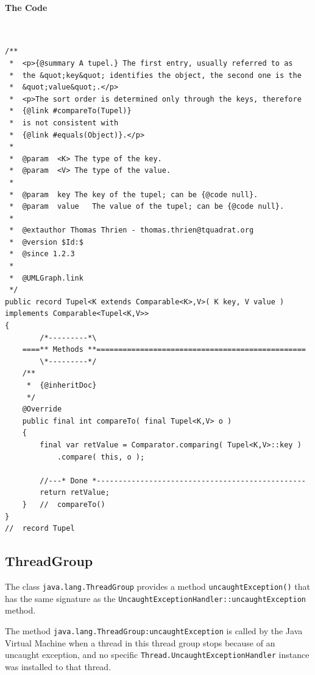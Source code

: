 \paragraph{The Code} \
\begin{lstlisting}[caption={A tupel class}]
/**
 *  <p>{@summary A tupel.} The first entry, usually referred to as 
 *  the &quot;key&quot; identifies the object, the second one is the
 *  &quot;value&quot;.</p>
 *  <p>The sort order is determined only through the keys, therefore
 *  {@link #compareTo(Tupel)}
 *  is not consistent with
 *  {@link #equals(Object)}.</p>
 *
 *  @param  <K> The type of the key.
 *  @param  <V> The type of the value.
 *
 *  @param  key The key of the tupel; can be {@code null}.
 *  @param  value   The value of the tupel; can be {@code null}.
 *
 *  @extauthor Thomas Thrien - thomas.thrien@tquadrat.org
 *  @version $Id:$
 *  @since 1.2.3
 *
 *  @UMLGraph.link
 */
public record Tupel<K extends Comparable<K>,V>( K key, V value ) implements Comparable<Tupel<K,V>>
{
        /*---------*\
    ====** Methods **================================================
        \*---------*/
    /**
     *  {@inheritDoc} 
     */
    @Override
    public final int compareTo( final Tupel<K,V> o )
    {
        final var retValue = Comparator.comparing( Tupel<K,V>::key )
            .compare( this, o ); 

        //---* Done *------------------------------------------------
        return retValue;
    }   //  compareTo()
}
//  record Tupel
\end{lstlisting}


\subsection{ThreadGroup}\label{sec:ThreadGroup}
The class \lstinline|java.lang.ThreadGroup|\autocite{ORACLE_DOC_THREADGROUP_CLASS} provides a method \lstinline|uncaughtException()| that has the same signature as the \lstinline|UncaughtExceptionHandler::uncaughtException|\autocite{ORACLE_DOC_UNCAUGHTEXCEPTIONHANDLER:uncaughtException} method.

The method \lstinline|java.lang.ThreadGroup:uncaughtException| is called by the Java Virtual Machine when a thread in this thread group stops because of an uncaught exception, and no specific \lstinline|Thread.UncaughtExceptionHandler|\autocite{ORACLE_DOC_UNCAUGHTEXCEPTIONHANDLER_INTERFACE} instance was installed
to that thread.

